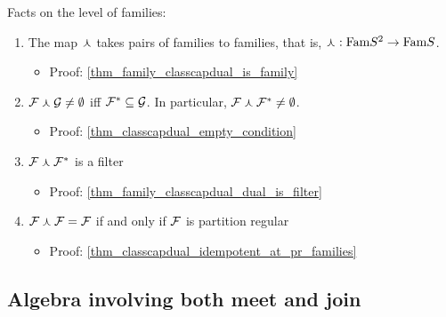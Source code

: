 Facts on the level of families:
\begin{enumerate}
    \item The map $\curlywedge$ takes pairs of families to families, that is, $\curlywedge: \text{Fam}{S}^2 \to \text{Fam}{S}$.
    \begin{itemize}
        \item Proof: \cref{thm_family_classcapdual_is_family}
    \end{itemize}

    \item {} $\mathcal{F} \curlywedge \mathcal{G} \neq \emptyset$ iff $\mathcal{F}^* \subseteq \mathcal{G}$. In particular, $\mathcal{F} \curlywedge \mathcal{F}^* \neq \emptyset$.
    \begin{itemize}
        \item Proof: \cref{thm_classcapdual_empty_condition}
    \end{itemize}

    \item $\mathcal{F} \curlywedge \mathcal{F}^*$ is a filter
    \begin{itemize}
        \item Proof: \cref{thm_family_classcapdual_dual_is_filter}
    \end{itemize}

    \item $\mathcal{F} \curlywedge \mathcal{F} = \mathcal{F}$ if and only if $\mathcal{F}$ is partition regular
    \begin{itemize}
        \item Proof: \cref{thm_classcapdual_idempotent_at_pr_families}
    \end{itemize}    
\end{enumerate}

\subsection{Algebra involving both meet and join}



